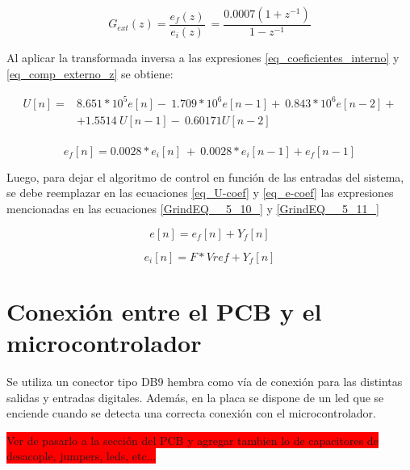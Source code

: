 \begin{equation} \label{eq_comp_externo_z} 
	G_{ext}(z)=\frac{e_f(z)}{e_i(z)}\ =\frac{0.0007(1+z^{-1})}{1-z^{-1}} 
\end{equation} 

Al aplicar la transformada inversa a las expresiones \ref{eq_coeficientes_interno} y \ref{eq_comp_externo_z} se obtiene:

\begin{equation} 
	\begin{aligned}\label{eq_U-coef}
		U[n]=&8.651*10^5e[n]-\ 1.709*10^6e[n-1]+\ 0.843*10^6e[n-2]+\\
		&+1.5514\ U[n-1]-\ 0.60171U[n-2]\\ 
	\end{aligned}
\end{equation}

\begin{equation} \label{eq_e-coef} 
	e_f[n]=0.0028*e_i[n]\ +\ {0.0028*e}_i[n-1]+e_f[n-1] 
\end{equation} 

Luego, para dejar el algoritmo de control en funci\'{o}n de las entradas del sistema, se debe reemplazar en las ecuaciones \ref{eq_U-coef} y \ref{eq_e-coef} las expresiones mencionadas en las ecuaciones \ref{GrindEQ__5_10_} y \ref{GrindEQ__5_11_}

\begin{equation} \label{GrindEQ__5_10_} 
	e[n]=e_f[n]+Y_f[n] 
\end{equation} 

\begin{equation} \label{GrindEQ__5_11_} 
	e_i[n]=F*Vref+Y_f[n] 
\end{equation} 


\section{Conexi\'{o}n entre el PCB y el microcontrolador}

 Se utiliza un conector tipo DB9 hembra como v\'{i}a de conexi\'{o}n para las distintas salidas y entradas digitales. Adem\'{a}s, en la placa se dispone de un led que se enciende cuando  se detecta una correcta conexi\'{o}n con el microcontrolador.
 
 \colorbox{red}{Ver de pasarlo a la sección del PCB y agregar tambien lo de capacitores de desacople, jumpers, leds, etc...}







